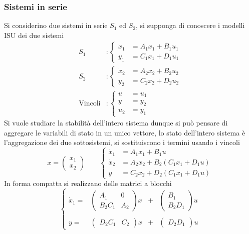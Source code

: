 \subsubsection{Sistemi in serie}
Si considerino due sistemi in serie $S_1$ ed $S_2$, si supponga di conoscere i
modelli ISU dei due sistemi
$$
\begin{aligned}
S_1 &: \left\{\begin{aligned}
\dot{x}_1 & = A_1x_1 + B_1u_1\\
y_1 &= C_1 x_1 + D_1u_1
\end{aligned}\right. \\
S_2 & : \left\{\begin{aligned}
\dot{x}_2 & = A_2x_2 + B_2u_2\\
y_2 &= C_2 x_2 + D_2u_2
\end{aligned}\right. \\
\text{Vincoli} &: \left\{\begin{aligned}
u&=u_1\\
y&=y_2\\
u_2 &=y_1
\end{aligned}\right.
\end{aligned}
$$
Si vuole studiare la stabilità dell'intero sistema dunque si può pensare di
aggregare le variabili di stato in un unico vettore, lo stato dell'intero
sistema è l'aggregazione dei due sottosistemi, si sostituiscono i termini
usando i vincoli
$$
x = \begin{pmatrix}
x_1 \\ x_2
\end{pmatrix}\qquad
\left\{\begin{aligned}
\dot{x}_1 &= A_1 x_1 + B_1u\\
\dot{x}_2 &= A_2 x_2 + B_2(C_1x_1 + D_1u)\\
y &= C_2x_2 + D_2(C_1x_1 + D_1u)
\end{aligned}\right.
$$
In forma compatta si realizzano delle matrici a blocchi
$$
\left\{\begin{array}{cccc}
\dot{x}_1 =& \begin{pmatrix}
A_1 & 0 \\ B_2C_1 & A_2
\end{pmatrix}x& +& \begin{pmatrix}
B_1 \\ B_2D_1
\end{pmatrix}u\\ \\
y =& \begin{pmatrix}
D_2C_1 & C_2
\end{pmatrix}x &+& \begin{pmatrix}
D_2D_1
\end{pmatrix}u
\end{array}\right.
$$

